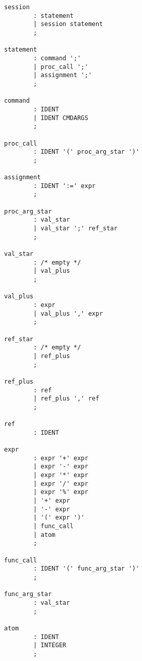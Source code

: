 \begin{verbatim}
session
        : statement
        | session statement
        ;
        
statement        
        : command ';'
        | proc_call ';'
        | assignment ';'
        ;

command
        : IDENT        
        | IDENT CMDARGS        
        ;

proc_call
        : IDENT '(' proc_arg_star ')' 
        ;

assignment
        : IDENT ':=' expr
        ;

proc_arg_star
        : val_star 
        | val_star ';' ref_star        
        ;

val_star
        : /* empty */
        | val_plus
        ;

val_plus
        : expr
        | val_plus ',' expr
        ;

ref_star
        : /* empty */
        | ref_plus
        ;

ref_plus
        : ref
        | ref_plus ',' ref
        ;

ref
        : IDENT        

expr
        : expr '+' expr        
        | expr '-' expr
        | expr '*' expr
        | expr '/' expr
        | expr '%' expr
        | '+' expr
        | '-' expr
        | '(' expr ')'
        | func_call
        | atom
        ;

func_call
        : IDENT '(' func_arg_star ')' 
        ;

func_arg_star
        : val_star 
        ;

atom
        : IDENT
        | INTEGER
        ;
\end{verbatim}
